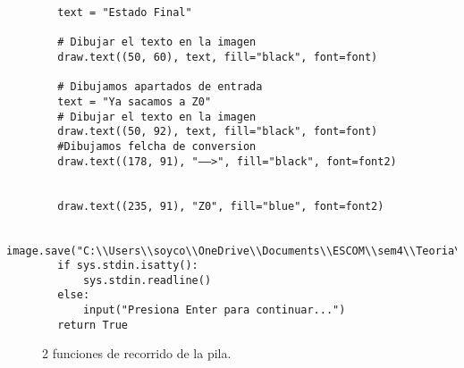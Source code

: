 \begin{enumerate}
\begin{lstlisting}
        text = "Estado Final"

        # Dibujar el texto en la imagen
        draw.text((50, 60), text, fill="black", font=font)
        
        # Dibujamos apartados de entrada
        text = "Ya sacamos a Z0"
        # Dibujar el texto en la imagen
        draw.text((50, 92), text, fill="black", font=font)
        #Dibujamos felcha de conversion
        draw.text((178, 91), "——>", fill="black", font=font2)
                
        
        draw.text((235, 91), "Z0", fill="blue", font=font2)
        
        image.save("C:\\Users\\soyco\\OneDrive\\Documents\\ESCOM\\sem4\\Teoria\\P2\\Prog4\\output\\animacion.png")
        if sys.stdin.isatty():
            sys.stdin.readline()
        else:
            input("Presiona Enter para continuar...")
        return True    

\end{lstlisting}
\begin{figure}[h]
\begin{center}
\end{center}
\caption{2 funciones de recorrido de la pila.}
\label{fig:imagen}
\end{figure}
\newpage


\end{enumerate}
